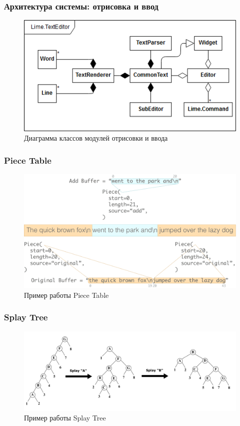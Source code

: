 \documentclass[10pt, unicode]{beamer}
\begin{document}
    \begin{frame}
        \frametitle{Архитектура системы: отрисовка и ввод}
        \begin{figure}
            \centering
            \includegraphics[width=\textwidth]{diagrams/EditorScheme.png}
            \caption{Диаграмма классов модулей отрисовки и ввода}
        \end{figure}
    \end{frame}
    \begin{frame}
        \frametitle{Piece Table}
        \begin{figure}
            \centering
            \includegraphics[width=\textwidth]{images/PieceTableExample.png}
            \caption{Пример работы Piece Table}
        \end{figure}
    \end{frame}
    \begin{frame}
        \frametitle{Splay Tree}
        \begin{figure}
            \centering
            \includegraphics[width=\textwidth]{images/SplayTreeExample.png}
            \caption{Пример работы Splay Tree}
        \end{figure}
    \end{frame}
\end{document}
